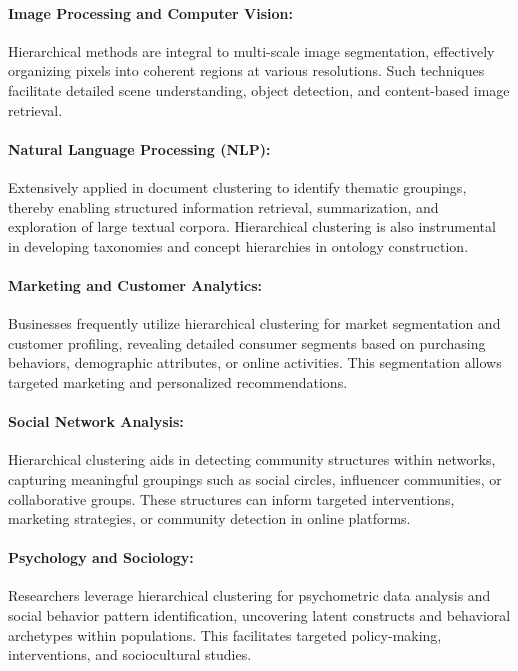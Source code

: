 \paragraph{Image Processing and Computer Vision:} Hierarchical
methods are integral to multi-scale image segmentation,
effectively organizing pixels into coherent regions at various
resolutions. Such techniques facilitate detailed scene
understanding, object detection, and content-based image retrieval.

\paragraph{Natural Language Processing (NLP):} Extensively
applied in document clustering to identify thematic groupings,
thereby enabling structured information retrieval, summarization,
and exploration of large textual corpora. Hierarchical clustering
is also instrumental in developing taxonomies and concept
hierarchies in ontology construction.

\paragraph{Marketing and Customer Analytics:} Businesses
frequently utilize hierarchical clustering for market
segmentation and customer profiling, revealing detailed consumer
segments based on purchasing behaviors, demographic attributes,
or online activities. This segmentation allows targeted marketing
and personalized recommendations.

\paragraph{Social Network Analysis:} Hierarchical clustering
aids in detecting community structures within networks, capturing
meaningful groupings such as social circles, influencer
communities, or collaborative groups. These structures can inform
targeted interventions, marketing strategies, or community
detection in online platforms.

\paragraph{Psychology and Sociology:} Researchers leverage
hierarchical clustering for psychometric data analysis and social
behavior pattern identification, uncovering latent constructs and
behavioral archetypes within populations. This facilitates
targeted policy-making, interventions, and sociocultural studies.

